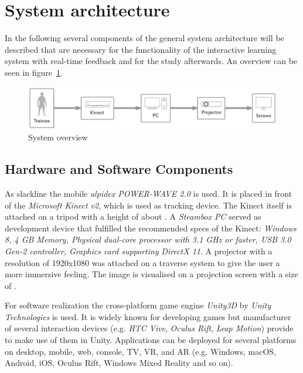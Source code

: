 \section{System architecture}\label{5_3_systemArchitecture}
In the following several components of the general system architecture will be described that are necessary for the functionality of the interactive learning system with real-time feedback and for the study afterwards. An overview can be seen in figure~\ref{fig:5_3_systemArchitecture}.
\begin{figure}[htb]
	\centering
	\begin{minipage}[t]{1\linewidth}
		\centering
		\includegraphics[width=1\linewidth]{Pictures/5_3_systemArchitecture}
		\caption{System overview}
		\label{fig:5_3_systemArchitecture}
	\end{minipage}
\end{figure}

\subsection{Hardware and Software Components}

As slackline the mobile \textit{alpidex POWER-WAVE 2.0} is used. It is placed in front of the \textit{Microsoft Kinect v2}, which is used as tracking device. The Kinect itself is attached on a  tripod with a height of about . A \textit{Steambox PC}  served as development device that fulfilled the recommended specs of the Kinect: \textit{Windows 8, 4 GB Memory, Physical dual-core processor with 3.1 GHz or faster, USB 3.0 Gen-2 controller, Graphics card supporting DirectX 11}. A projector  with a resolution of 1920x1080 was attached on a traverse system to give the user a more immersive feeling. The image is visualised on a projection screen with a size of .

For software realization the cross-platform game engine \textit{Unity3D} by \textit{Unity Technologies} is used. It is widely known for developing games but manufacturer of several interaction devices (e.g. \textit{HTC Vive}, \textit{Oculus Rift}, \textit{Leap Motion}) provide  to make use of them in Unity. Applications can be deployed for several platforms on desktop, mobile, web, console, TV, VR, and AR (e.g. Windows, macOS, Android, iOS, Oculus Rift, Windows Mixed Reality and so on).

